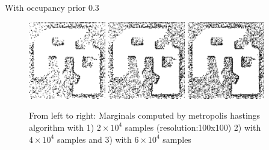 \documentclass{beamer}
\begin{document}
\begin{frame}
  With occupancy prior 0.3
  \begin{figure}
    \includegraphics[width=0.3\textwidth]{figures/occgridvis200.png}
    \includegraphics[width=0.3\textwidth]{figures/occgridvis400.png}
    \includegraphics[width=0.3\textwidth]{figures/occgridvis600.png}
    \caption{From left to right: Marginals computed by metropolis hastings algorithm with 1) $2 \times 10^4$ samples (resolution:100x100) 2) with $4 \times 10^4$ samples and 3) with $6 \times 10^4$ samples }
    \label{fig:metropolis-results}
  \end{figure}
\end{frame}
\end{document}
